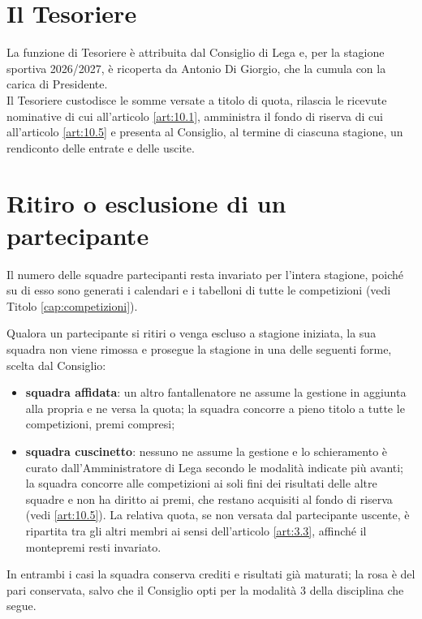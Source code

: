\section{Il Tesoriere}
\label{art:1.4}

La funzione di Tesoriere è attribuita dal Consiglio di Lega e, per la stagione sportiva 2026/2027, è ricoperta da Antonio Di Giorgio, che la cumula con la carica di Presidente.\\
Il Tesoriere custodisce le somme versate a titolo di quota, rilascia le ricevute nominative di cui all'articolo \ref{art:10.1}, amministra il fondo di riserva di cui all'articolo \ref{art:10.5} e presenta al Consiglio, al termine di ciascuna stagione, un rendiconto delle entrate e delle uscite.

\section{Ritiro o esclusione di un partecipante}
\label{art:1.5}

Il numero delle squadre partecipanti resta invariato per l'intera stagione, poiché su di esso sono generati i calendari e i tabelloni di tutte le competizioni (vedi Titolo \ref{cap:competizioni}).

Qualora un partecipante si ritiri o venga escluso a stagione iniziata, la sua squadra non viene rimossa e prosegue la stagione in una delle seguenti forme, scelta dal Consiglio:

\begin{itemize}
\item \textbf{squadra affidata}: un altro fantallenatore ne assume la gestione in aggiunta alla propria e ne versa la quota; la squadra concorre a pieno titolo a tutte le competizioni, premi compresi;
\item \textbf{squadra cuscinetto}: nessuno ne assume la gestione e lo schieramento è curato dall'Amministratore di Lega secondo le modalità indicate più avanti; la squadra concorre alle competizioni ai soli fini dei risultati delle altre squadre e non ha diritto ai premi, che restano acquisiti al fondo di riserva (vedi \ref{art:10.5}). La relativa quota, se non versata dal partecipante uscente, è ripartita tra gli altri membri ai sensi dell'articolo \ref{art:3.3}, affinché il montepremi resti invariato.
\end{itemize}

In entrambi i casi la squadra conserva crediti e risultati già maturati; la rosa è del pari conservata, salvo che il Consiglio opti per la modalità 3 della disciplina che segue.

